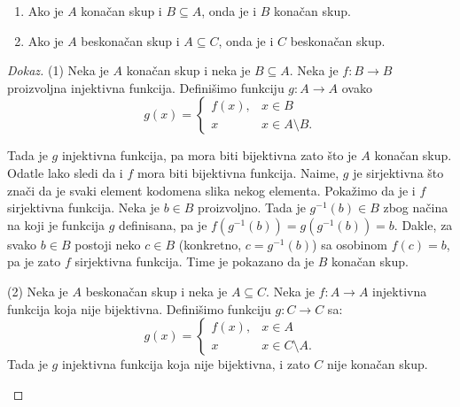 \begin{THM}
  \begin{enumerate}\itemsep -1pt
  \item Ako je $A$ kona\v can skup i $B \subseteq A$, onda je i $B$ kona\v can skup.
  \item Ako je $A$ beskona\v can skup i $A \subseteq C$, onda je i $C$ beskona\v can skup.
  \end{enumerate}
\end{THM}
\begin{proof}[Dokaz]
  (1)
  Neka je $A$ kona\v can skup i neka je $B \subseteq A$. Neka je $f : B \to B$ proizvoljna injektivna funkcija.
  Defini\v simo funkciju $g : A \to A$ ovako
  $$
    g(x) = \begin{cases}
      f(x), & x \in B\\
      x     & x \in A \setminus B.
    \end{cases}
  $$

\noindent
\begin{minipage}{3in}
  Tada je $g$ injektivna funkcija, pa mora biti bijektivna zato \v sto je $A$ kona\v can skup.
  Odatle lako sledi da i $f$ mora biti bijektivna funkcija. Naime, $g$ je sirjektivna \v sto zna\v ci
  da je svaki element kodomena slika nekog elementa. Poka\v zimo da je i $f$ sirjektivna funkcija.
  Neka je $b \in B$ proizvoljno. Tada je $g^{-1}(b) \in B$ zbog na\v cina na koji je funkcija $g$ definisana,
  pa je $f(g^{-1}(b)) = g(g^{-1}(b)) = b$. Dakle, za svako $b \in B$ postoji neko $c \in B$
  (konkretno, $c = g^{-1}(b)$) sa osobinom $f(c) = b$, pa je zato $f$ sirjektivna
  funkcija. Time je pokazano da je $B$ kona\v can skup.
\end{minipage}
\hfill
\begin{minipage}{2.5in}
  \begin{center}
    
  \end{center}
\end{minipage}

\medskip

\noindent
\begin{minipage}{3in}
  \hspace*{1.5em}(2)
  Neka je $A$ beskona\v can skup i neka je $A \subseteq C$. Neka je $f : A \to A$ injektivna funkcija koja nije bijektivna.
  Defini\v simo funkciju $g : C \to C$ sa:
  $$
    g(x) = \begin{cases}
      f(x), & x \in A\\
      x     & x \in C \setminus A.
    \end{cases}
  $$
  Tada je $g$ injektivna funkcija koja nije bijektivna, i zato $C$ nije kona\v can skup.\qedhere
\end{minipage}
\hfill
\begin{minipage}{2.5in}
  \begin{center}
    
  \end{center}
\end{minipage}
\end{proof}


